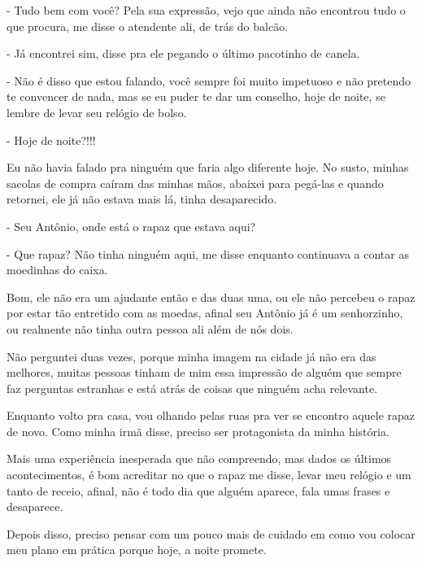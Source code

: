 - Tudo bem com você? Pela sua expressão, vejo que ainda não encontrou tudo o que procura, me disse o atendente ali, de trás do balcão.

- Já encontrei sim, disse pra ele pegando o último pacotinho de canela.

- Não é disso que estou falando, você sempre foi muito impetuoso e não pretendo te convencer de nada, mas se eu puder te dar um conselho, hoje de noite, se lembre de levar seu relógio de bolso.

- Hoje de noite?!!!

Eu não havia falado pra ninguém que faria algo diferente hoje. No susto, minhas sacolas de compra caíram das minhas mãos, abaixei para pegá-las e quando retornei, ele já não estava mais lá, tinha desaparecido.

- Seu Antônio, onde está o rapaz que estava aqui? 

- Que rapaz? Não tinha ninguém aqui, me disse enquanto continuava a contar as moedinhas do caixa.

Bom, ele não era um ajudante então e das duas uma, ou ele não percebeu o rapaz por estar tão entretido com as moedas, afinal seu Antônio já é um senhorzinho, ou realmente não tinha outra pessoa ali além de nós dois.

Não perguntei duas vezes, porque minha imagem na cidade já não era das melhores, muitas pessoas tinham de mim essa impressão de alguém que sempre faz perguntas estranhas e está atrás de coisas que ninguém acha relevante. 

Enquanto volto pra casa, vou olhando pelas ruas pra ver se encontro aquele rapaz de novo. Como minha irmã disse, preciso ser protagonista da minha história.

Mais uma experiência inesperada que não compreendo, mas dados os últimos acontecimentos, é bom acreditar no que o rapaz me disse, levar meu relógio e um tanto de receio, afinal, não é todo dia que alguém aparece, fala umas frases e desaparece. 

Depois disso, preciso pensar com um pouco mais de cuidado em como vou colocar meu plano em prática porque hoje, a noite promete.


